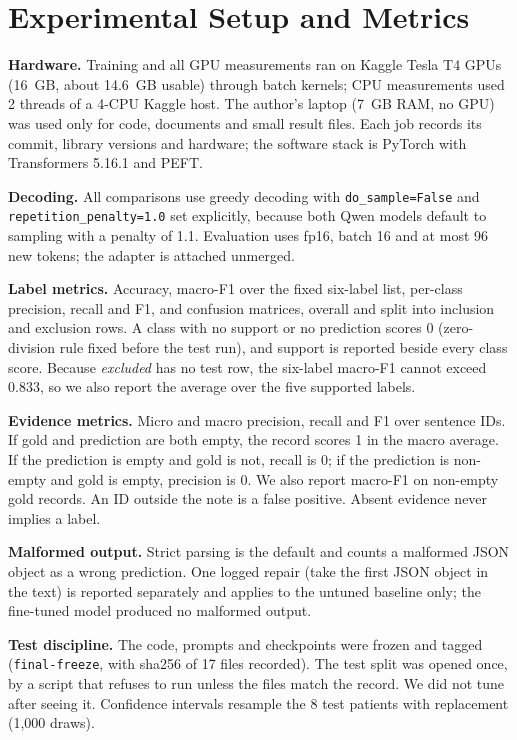 \documentclass[conference]{IEEEtran}
\begin{document}
\section{Experimental Setup and Metrics}
\textbf{Hardware.} Training and all GPU measurements ran on Kaggle Tesla T4 GPUs (16~GB, about 14.6~GB usable) through batch kernels; CPU measurements used 2 threads of a 4-CPU Kaggle host. The author's laptop (7~GB RAM, no GPU) was used only for code, documents and small result files. Each job records its commit, library versions and hardware; the software stack is PyTorch with Transformers 5.16.1 and PEFT.

\textbf{Decoding.} All comparisons use greedy decoding with \texttt{do\_sample=False} and \texttt{repetition\_penalty=1.0} set explicitly, because both Qwen models default to sampling with a penalty of 1.1. Evaluation uses fp16, batch 16 and at most 96 new tokens; the adapter is attached unmerged.

\textbf{Label metrics.} Accuracy, macro-F1 over the fixed six-label list, per-class precision, recall and F1, and confusion matrices, overall and split into inclusion and exclusion rows. A class with no support or no prediction scores 0 (zero-division rule fixed before the test run), and support is reported beside every class score. Because \emph{excluded} has no test row, the six-label macro-F1 cannot exceed 0.833, so we also report the average over the five supported labels.

\textbf{Evidence metrics.} Micro and macro precision, recall and F1 over sentence IDs. If gold and prediction are both empty, the record scores 1 in the macro average. If the prediction is empty and gold is not, recall is 0; if the prediction is non-empty and gold is empty, precision is 0. We also report macro-F1 on non-empty gold records. An ID outside the note is a false positive. Absent evidence never implies a label.

\textbf{Malformed output.} Strict parsing is the default and counts a malformed JSON object as a wrong prediction. One logged repair (take the first JSON object in the text) is reported separately and applies to the untuned baseline only; the fine-tuned model produced no malformed output.

\textbf{Test discipline.} The code, prompts and checkpoints were frozen and tagged (\texttt{final-freeze}, with sha256 of 17 files recorded). The test split was opened once, by a script that refuses to run unless the files match the record. We did not tune after seeing it. Confidence intervals resample the 8 test patients with replacement (1,000 draws).
\end{document}
